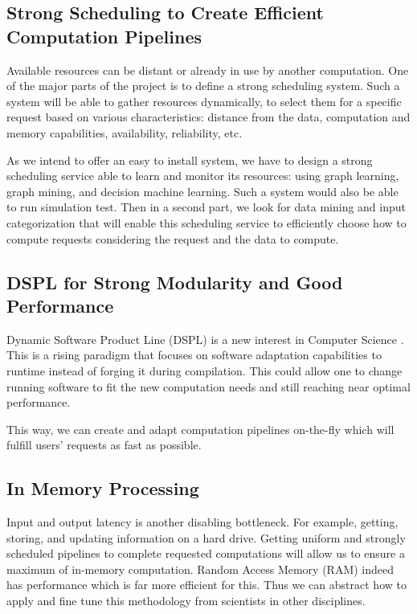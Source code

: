 		\subsection{Strong Scheduling to Create Efficient Computation Pipelines}
			Available resources can be distant or already in use by another computation. One of the major parts of the project is to define a strong scheduling system. Such a system will be able to gather resources dynamically, to select them for a specific request based on various characteristics: distance from the data, computation and memory capabilities, availability, reliability, etc.
			
			As we intend to offer an easy to install system, we have to design a strong scheduling service able to learn and monitor its resources: using graph learning, graph mining, and decision machine learning. Such a system would also be able to run simulation test. Then in a second part, we look for data mining and input categorization that will enable this scheduling service to efficiently choose how to compute requests considering the request and the data to compute.

		\subsection{DSPL for Strong Modularity and Good Performance}
			Dynamic Software Product Line (DSPL) is a new interest in Computer Science \citep{DSPL}. This is a rising paradigm that focuses on software adaptation capabilities to runtime instead of forging it during compilation. This could allow one to change running software to fit the new computation needs and still reaching near optimal performance.
			
			This way, we can create and adapt computation pipelines on-the-fly which will fulfill users' requests as fast as possible.
		
		\subsection{In Memory Processing}
			Input and output latency is another disabling bottleneck. For example, getting, storing, and updating information on a hard drive. Getting uniform and strongly scheduled pipelines to complete requested computations will allow us to ensure a maximum of in-memory computation. Random Access Memory (RAM) indeed has performance which is far more efficient for this. Thus we can abstract how to apply and fine tune this methodology from scientists in other disciplines.
			
